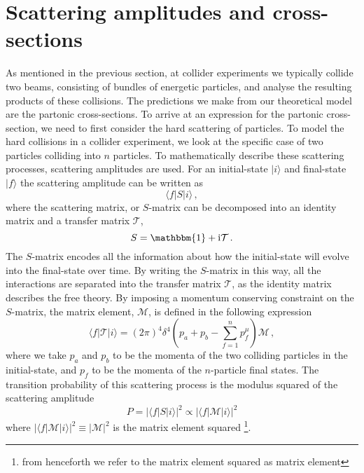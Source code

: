 \documentclass[main.tex]{subfiles}
\begin{document}
\section{Scattering amplitudes and cross-sections}\label{sec:xs}
    As mentioned in the previous section, at
    collider experiments we typically collide
    two beams, consisting of bundles of energetic
    particles, and analyse the resulting products
    of these collisions. The predictions we make
    from our theoretical model are the partonic
    cross-sections. To arrive at an expression
    for the partonic cross-section, we need to
    first consider the hard scattering of particles.
    To model the hard collisions in
    a collider experiment, we look at the specific
    case of two particles colliding into $n$ particles.
    To mathematically describe these
    scattering processes, scattering amplitudes are used.
    For an initial-state
    $|i\rangle$ and final-state $|f\rangle$
    the scattering amplitude can be written as
    \begin{equation}\label{eqn:scattering}
        \langle f | S | i \rangle \, ,
    \end{equation}
    where the scattering matrix, or $S$-matrix
    can be decomposed into an identity matrix
    and a transfer matrix $\mathcal{T}$,
    \begin{equation}\label{eqn:S_matrix}
        S = \mathbbm{1} + \mathrm{i}\mathcal{T} \, .
    \end{equation}
    The $S$-matrix encodes all the information
    about how the initial-state will evolve
    into the final-state over time. By writing
    the $S$-matrix in this way, all the interactions
    are separated into the transfer matrix $\mathcal{T}$,
    as the identity matrix describes the free theory.
    By imposing a momentum conserving constraint
    on the $S$-matrix, the matrix element,
    $\mathcal{M}$, is defined in the following expression
    \begin{equation}\label{eqn:matrix_element}
        \langle f | \mathcal{T} | i \rangle = (2\pi)^{4} \delta^{4}\left(p_{a} + p_{b} - \sum_{f=1}^{n} p_{f}^{\mu}\right) \mathcal{M} \, ,
    \end{equation}
    where we take $p_{a}$ and $p_{b}$ to be
    the momenta of the two colliding
    particles in the initial-state, and $p_{f}$ to be the
    momenta of the $n$-particle final states.
    The transition probability of this scattering process
    is the modulus squared of the scattering amplitude
    \begin{equation}\label{eqn:S_prob}
        P = |\langle f | S | i \rangle|^{2} \propto | \langle f | \mathcal{M} | i \rangle |^{2}
    \end{equation}
    where $|\langle f | \mathcal{M} | i \rangle|^{2}  \equiv |\mathcal{M}|^{2}$
    is the matrix element squared \footnote{from henceforth we refer to the matrix
    element squared as matrix element}.
    
\end{document}
